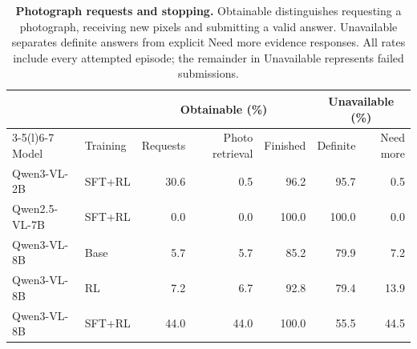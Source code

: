 \begin{table}[t]\centering\small\setlength{\tabcolsep}{5pt}
\begin{minipage}{.84\textwidth}\centering
\caption{\textbf{Photograph requests and stopping.} Obtainable distinguishes requesting a photograph, receiving new pixels and submitting a valid answer. Unavailable separates definite answers from explicit Need more evidence responses. All rates include every attempted episode; the remainder in Unavailable represents failed submissions.}
\label{tab:search-behavior}
\begin{tabular}{@{}llrrrrr@{}}\toprule
 & & \multicolumn{3}{c}{Obtainable (\%)} & \multicolumn{2}{c}{Unavailable (\%)}\\
\cmidrule(lr){3-5}\cmidrule(l){6-7}
Model & Training & Requests & Photo retrieval & Finished & Definite & Need more\\\midrule
Qwen3-VL-2B & SFT+RL & 30.6 & 0.5 & 96.2 & 95.7 & 0.5\\
Qwen2.5-VL-7B & SFT+RL & 0.0 & 0.0 & 100.0 & 100.0 & 0.0\\
Qwen3-VL-8B & Base & 5.7 & 5.7 & 85.2 & 79.9 & 7.2\\
Qwen3-VL-8B & RL & 7.2 & 6.7 & 92.8 & 79.4 & 13.9\\
Qwen3-VL-8B & SFT+RL & 44.0 & 44.0 & 100.0 & 55.5 & 44.5\\
\bottomrule\end{tabular}\end{minipage}\end{table}

